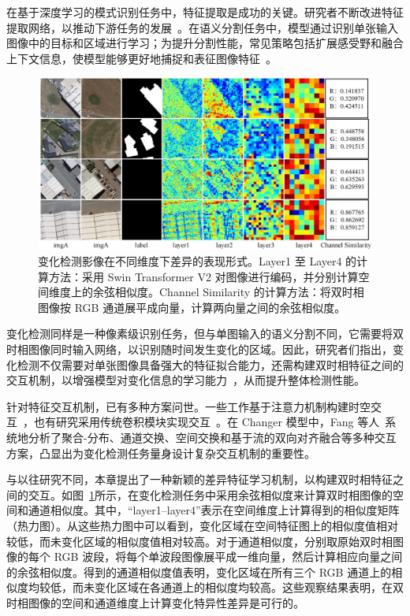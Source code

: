 在基于深度学习的模式识别任务中，特征提取是成功的关键。研究者不断改进特征提取网络，以推动下游任务的发展~\cite{He2015DeepRL, Dosovitskiy2020AnII, Liu2021SwinTH}。在语义分割任务中，模型通过识别单张输入图像中的目标和区域进行学习；为提升分割性能，常见策略包括扩展感受野和融合上下文信息，使模型能够更好地捕捉和表征图像特征~\cite{chen2018encoder, Wang2024PyramidMambaRP}。

\begin{figure}[!htbp]
  \centering
  \includegraphics[width=\textwidth]{paper_figures/基于双时相遥感影像特征交互的变化检测算法研究/LENet/lenet_similarity.png}
  \caption{变化检测影像在不同维度下差异的表现形式。Layer1 至 Layer4 的计算方法：采用 Swin Transformer V2 对图像进行编码，并分别计算空间维度上的余弦相似度。Channel Similarity 的计算方法：将双时相图像按 RGB 通道展平成向量，计算两向量之间的余弦相似度。}
  \label{fig:lenet_similarity}
\end{figure}

变化检测同样是一种像素级识别任务，但与单图输入的语义分割不同，它需要将双时相图像同时输入网络，以识别随时间发生变化的区域。因此，研究者们指出，变化检测不仅需要对单张图像具备强大的特征拟合能力，还需构建双时相特征之间的交互机制，以增强模型对变化信息的学习能力~\cite{dong_changeclip_2024, Noman2023RemoteSC, zhao_exchanging_2023}，从而提升整体检测性能。

针对特征交互机制，已有多种方案问世。一些工作基于注意力机制构建时空交互~\cite{Peng2024FDAFFNetAF, Dong2024ISANetAI}，也有研究采用传统卷积模块实现交互~\cite{b_huang_remote-sensing_2024, Zhang2020ADS}。在 Changer 模型中，Fang 等人~\cite{Fang2022ChangerFI}系统地分析了聚合-分布、通道交换、空间交换和基于流的双向对齐融合等多种交互方案，凸显出为变化检测任务量身设计复杂交互机制的重要性。

与以往研究不同，本章提出了一种新颖的差异特征学习机制，以构建双时相特征之间的交互。如图~\ref{fig:lenet_similarity}所示，在变化检测任务中采用余弦相似度来计算双时相图像的空间和通道相似度。其中，“layer1–layer4”表示在空间维度上计算得到的相似度矩阵（热力图）。从这些热力图中可以看到，变化区域在空间特征图上的相似度值相对较低，而未变化区域的相似度值相对较高。对于通道相似度，分别取原始双时相图像的每个 RGB 波段，将每个单波段图像展平成一维向量，然后计算相应向量之间的余弦相似度。得到的通道相似度值表明，变化区域在所有三个 RGB 通道上的相似度均较低，而未变化区域在各通道上的相似度均较高。这些观察结果表明，在双时相图像的空间和通道维度上计算变化特异性差异是可行的。

